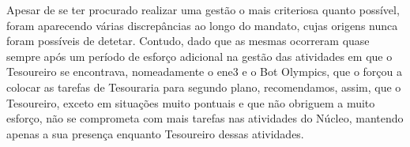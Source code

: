{ %
Apesar de se ter procurado realizar uma gestão o mais criteriosa quanto possível, foram aparecendo várias discrepâncias ao longo do mandato, cujas origens nunca foram possíveis de detetar. Contudo, dado que as mesmas ocorreram quase sempre após um período de esforço adicional na gestão das atividades em que o Tesoureiro se encontrava, nomeadamente o \acrshort{ene3} e o Bot Olympics, que o forçou a colocar as tarefas de Tesouraria para segundo plano, recomendamos, assim, que o Tesoureiro, exceto em situações muito pontuais e que não obriguem a muito esforço, não se comprometa com mais tarefas nas atividades do Núcleo, mantendo apenas a sua presença enquanto Tesoureiro dessas atividades.
}
{ %
}